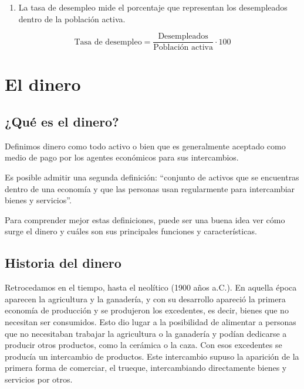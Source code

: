 \documentclass[
]{krantz}
\providecommand{\tightlist}{%
  \setlength{\itemsep}{0pt}\setlength{\parskip}{0pt}}
\begin{document}
\begin{enumerate}
\def\labelenumi{\alph{enumi})}
\setcounter{enumi}{1}
\tightlist
\item
  La tasa de desempleo mide el porcentaje que representan los desempleados dentro de la población activa.
\end{enumerate}

\[\mathrm {\text{Tasa de desempleo} = \frac{\text{Desempleados}}{\text{Población activa}}·100}\]

\hypertarget{el-dinero}{%
\chapter{El dinero}\label{el-dinero}}

\hypertarget{quuxe9-es-el-dinero}{%
\section{¿Qué es el dinero?}\label{quuxe9-es-el-dinero}}

Definimos dinero como todo activo o bien que es generalmente aceptado como medio de pago por los agentes económicos para sus intercambios.

Es posible admitir una segunda definición: ``conjunto de activos que se encuentras dentro de una economía y que las personas usan regularmente para intercambiar bienes y servicios''.

Para comprender mejor estas definiciones, puede ser una buena idea ver cómo surge el dinero y cuáles son sus principales funciones y características.

\hypertarget{historia-del-dinero}{%
\section{Historia del dinero}\label{historia-del-dinero}}

Retrocedamos en el tiempo, hasta el neolítico (1900 años a.C.). En aquella época aparecen la agricultura y la ganadería, y con su desarrollo apareció la primera economía de producción y se produjeron los excedentes, es decir, bienes que no necesitan ser consumidos. Esto dio lugar a la posibilidad de alimentar a personas que no necesitaban trabajar la agricultura o la ganadería y podían dedicarse a producir otros productos, como la cerámica o la caza. Con esos excedentes se producía un intercambio de productos. Este intercambio supuso la aparición de la primera forma de comerciar, el trueque, intercambiando directamente bienes y servicios por otros.
\end{document}
